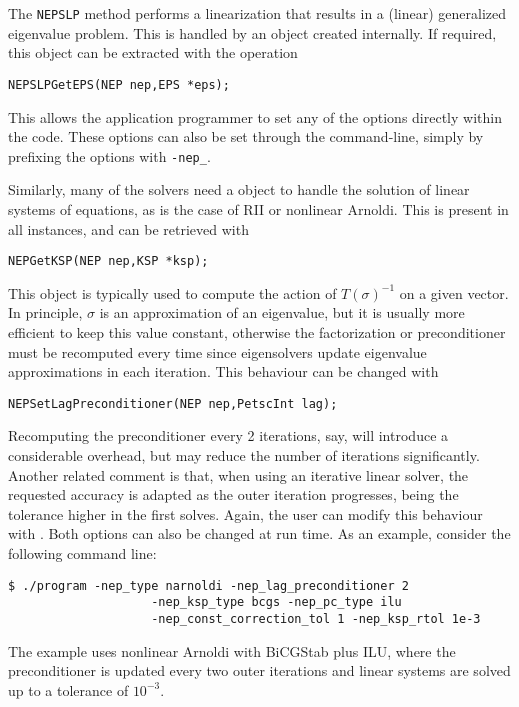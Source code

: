 The \texttt{NEPSLP} method performs a linearization that results in a (linear) generalized eigenvalue problem. This is handled by an  object created internally. If required, this  object can be extracted with the operation
	\begin{Verbatim}[fontsize=\small]
	NEPSLPGetEPS(NEP nep,EPS *eps);
	\end{Verbatim}
This allows the application programmer to set any of the  options directly within the code. These options can also be set through the command-line, simply by prefixing the  options with \texttt{-nep\_}.

Similarly, many of the  solvers need a  object to handle the solution of linear systems of equations, as is the case of RII or nonlinear Arnoldi. This  is present in all  instances, and can be retrieved with
	\begin{Verbatim}[fontsize=\small]
	NEPGetKSP(NEP nep,KSP *ksp);
	\end{Verbatim}

This  object is typically used to compute the action of $T(\sigma)^{-1}$ on a given vector. In principle, $\sigma$ is an approximation of an eigenvalue, but it is usually more efficient to keep this value constant, otherwise the factorization or preconditioner must be recomputed every time since eigensolvers update eigenvalue approximations in each iteration. This behaviour can be changed with
	\begin{Verbatim}[fontsize=\small]
	NEPSetLagPreconditioner(NEP nep,PetscInt lag);
	\end{Verbatim}
Recomputing the preconditioner every 2 iterations, say, will introduce a considerable overhead, but may reduce the number of iterations significantly. Another related comment is that, when using an iterative linear solver, the requested accuracy is adapted as the outer iteration progresses, being the tolerance higher in the first solves. Again, the user can modify this behaviour with . Both options can also be changed at run time. As an example, consider the following command line:
\begin{Verbatim}[fontsize=\small]
	$ ./program -nep_type narnoldi -nep_lag_preconditioner 2
                    -nep_ksp_type bcgs -nep_pc_type ilu
                    -nep_const_correction_tol 1 -nep_ksp_rtol 1e-3
\end{Verbatim}
The example uses nonlinear Arnoldi with BiCGStab plus ILU, where the preconditioner is updated every two outer iterations and linear systems are solved up to a tolerance of $10^{-3}$.

